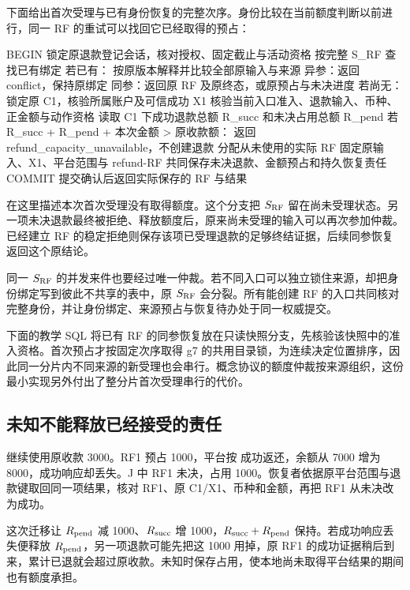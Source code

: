 下面给出首次受理与已有身份恢复的完整次序。身份比较在当前额度判断以前进行，同一 RF 的重试可以找回它已经取得的预占：

\begin{BookCode}
BEGIN
锁定原退款登记会话，核对授权、固定截止与活动资格
按完整 S_RF 查找已有绑定
若已有：
    按原版本解释并比较全部原输入与来源
    异参：返回 conflict，保持原绑定
    同参：返回原 RF 及原终态，或原预占与未决进度
若尚无：
    锁定原 C1，核验所属账户及可信成功 X1
    核验当前入口准入、退款输入、币种、正金额与动作资格
    读取 C1 下成功退款总额 R_succ 和未决占用总额 R_pend
    若 R_succ + R_pend + 本次金额 > 原收款额：
        返回 refund_capacity_unavailable，不创建退款
    分配从未使用的实际 RF
    固定原输入、X1、平台范围与 refund-RF
    共同保存未决退款、金额预占和持久恢复责任
COMMIT
提交确认后返回实际保存的 RF 与结果
\end{BookCode}

 在这里描述本次首次受理没有取得额度。这个分支把 $S_{\rm RF}$ 留在尚未受理状态。另一项未决退款最终被拒绝、释放额度后，原来尚未受理的输入可以再次参加仲裁。已经建立 RF 的稳定拒绝则保存该项已受理退款的足够终结证据，后续同参恢复返回这个原结论。

同一 $S_{\rm RF}$ 的并发来件也要经过唯一仲裁。若不同入口可以独立锁住来源，却把身份绑定写到彼此不共享的表中，原 $S_{\rm RF}$ 会分裂。所有能创建 RF 的入口共同核对完整身份，并让身份绑定、来源预占与恢复待办处于同一权威提交。

下面的教学 SQL 将已有 RF 的同参恢复放在只读快照分支，先核验该快照中的准入资格。首次预占才按固定次序取得 g7 的共用目录锁，为连续决定位置排序，因此同一分片内不同来源的新受理也会串行。概念协议的额度仲裁按来源组织，这份最小实现另外付出了整分片首次受理串行的代价。



\subsection*{未知不能释放已经接受的责任}

继续使用原收款 3000。RF1 预占 1000，平台按  成功返还，余额从 7000 增为 8000，成功响应却丢失。J 中 RF1 未决，占用 1000。恢复者依据原平台范围与退款键取回同一项结果，核对 RF1、原 C1/X1、币种和金额，再把 RF1 从未决改为成功。

这次迁移让 $R_{\rm pend}$ 减 1000、$R_{\rm succ}$ 增 1000，$R_{\rm succ}+R_{\rm pend}$ 保持。若成功响应丢失便释放 $R_{\rm pend}$，另一项退款可能先把这 1000 用掉，原 RF1 的成功证据稍后到来，累计已退就会超过原收款。未知时保存占用，使本地尚未取得平台结果的期间也有额度承担。

